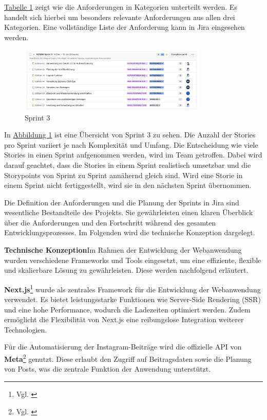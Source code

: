 \hyperref[tab:tab-1]{Tabelle 1} zeigt wie die Anforderungen in Kategorien unterteilt werden. Es handelt sich hierbei um besonders relevante Anforderungen aus
allen drei Kategorien. Eine vollständige Liste der Anforderung kann in Jira eingesehen werden.

\begin{figure}[htb]
    \centering
    \includegraphics[width=0.8\textwidth]{graphics/sprint_3_jira.png}
    \caption{Sprint 3}
    \label{fig:fig-1}
\end{figure}

In \hyperref[fig:fig-1]{Abbildung 1} ist eine Übersicht von Sprint 3 zu sehen. Die Anzahl der Stories pro Sprint variiert je nach Komplexität und Umfang.
Die Entscheidung wie viele Stories in einen Sprint aufgenommen werden, wird im Team getroffen. Dabei wird darauf geachtet, dass die Stories in einem Sprint
realistisch umsetzbar und die Storypoints von Sprint zu Sprint annähernd gleich sind. Wird eine Storie in einem Sprint nicht fertiggestellt, wird sie in
den nächsten Sprint übernommen.

Die Definition der Anforderungen und die Planung der Sprints in Jira sind wesentliche Bestandteile des Projekts. Sie gewährleisten einen klaren Überblick über die 
Anforderungen und den Fortschritt während des gesamten Entwicklungsprozesses. Im Folgenden wird die technische Konzeption dargelegt.

\textbf{Technische Konzeption}\quad Im Rahmen der Entwicklung der Webanwendung wurden verschiedene Frameworks und Tools eingesetzt, um eine effiziente, flexible und 
skalierbare Lösung zu gewährleisten. Diese werden nachfolgend erläutert.

\textbf{Next.js}\footnote{Vgl. \cite{nextjs_docs}} wurde als zentrales Framework für die Entwicklung der Webanwendung verwendet. Es bietet leistungsstarke Funktionen wie Server-Side Rendering (SSR) 
und eine hohe Performance, wodurch die Ladezeiten optimiert werden. Zudem ermöglicht die Flexibilität von Next.js eine reibungslose Integration weiterer Technologien.

Für die Automatisierung der Instagram-Beiträge wird die offizielle API von \textbf{Meta}\footnote{Vgl. \cite{facebook_graph_api}} genutzt. Diese erlaubt den Zugriff auf Beitragsdaten sowie die Planung von 
Posts, was die zentrale Funktion der Anwendung unterstützt.

